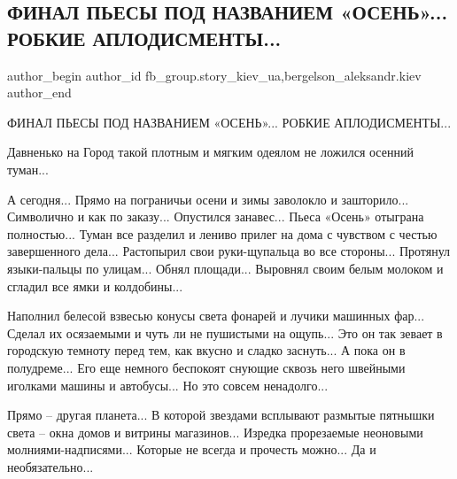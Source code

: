  
 
 
 
 
 
\subsection{ФИНАЛ ПЬЕСЫ ПОД НАЗВАНИЕМ «ОСЕНЬ»... РОБКИЕ АПЛОДИСМЕНТЫ...}
\label{sec:29_11_2021.fb.fb_group.story_kiev_ua.2.pjesa_osenj_final}
 
\ifcmt
 author_begin
   author_id fb_group.story_kiev_ua,bergelson_aleksandr.kiev
 author_end
\fi

ФИНАЛ ПЬЕСЫ ПОД НАЗВАНИЕМ «ОСЕНЬ»... РОБКИЕ АПЛОДИСМЕНТЫ...

Давненько на Город такой плотным и мягким одеялом не ложился осенний туман...

А сегодня... Прямо на пограничьи осени и зимы заволокло и зашторило... Символично и
как по заказу... Опустился занавес... Пьеса «Осень» отыграна полностью... Туман все
разделил и лениво прилег на дома с чувством с честью завершенного дела...
Растопырил свои руки-щупальца во все стороны... Протянул языки-пальцы по улицам...
Обнял площади... Выровнял своим белым молоком и сгладил все ямки и колдобины... 


Наполнил белесой взвесью конусы света фонарей и лучики машинных фар... Сделал их
осязаемыми и чуть ли не пушистыми на ощупь... Это он так зевает в городскую
темноту перед тем, как вкусно и сладко заснуть... А пока он в полудреме... Его еще
немного беспокоят снующие сквозь него швейными иголками машины и автобусы... Но
это совсем ненадолго...


Прямо – другая планета... В которой звездами всплывают размытые пятнышки света –
окна домов и витрины магазинов... Изредка прорезаемые неоновыми
молниями-надписями... Которые не всегда и прочесть можно... Да и необязательно...

